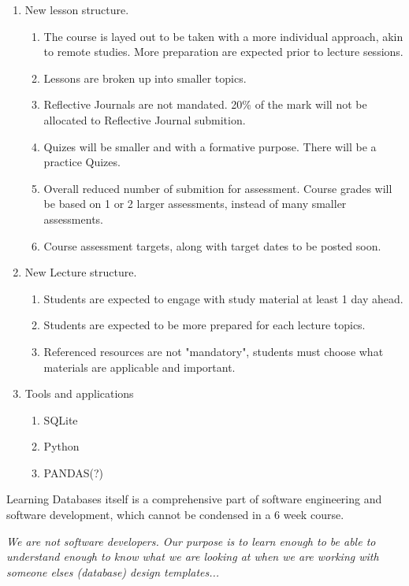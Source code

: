 {\begin{enumerate}
    \item New lesson structure.
        \begin{enumerate}
            \item The course is layed out to be taken with a more individual approach, akin to remote studies. More preparation are expected prior to lecture sessions.
            \item Lessons are broken up into smaller topics.
            \item Reflective Journals are not mandated. 20\% of the mark will not be allocated to Reflective Journal submition.
            \item Quizes will be smaller and with a formative purpose. There will be a practice Quizes.
            \item Overall reduced number of submition for assessment. Course grades will be based on 1 or 2 larger assessments, instead of many smaller assessments.
            \item Course assessment targets, along with target dates to be posted soon.
        \end{enumerate}
    \item New Lecture structure.
        \begin{enumerate}
            \item Students are expected to engage with study material at least 1 day ahead.
            \item Students are expected to be more prepared for each lecture topics.
            \item Referenced resources are not "mandatory", students must choose what materials are applicable and important.
        \end{enumerate}
    \item Tools and applications
        \begin{enumerate}
            \item SQLite
            \item Python
            \item PANDAS(?)
        \end{enumerate}
\end{enumerate}

Learning Databases itself is a comprehensive part of software engineering and software development, which cannot be condensed in a 6 week course.

\begin{displayquote}\label{quote}
    {\emph{We are not software developers. Our purpose is to learn enough to be able to understand enough to know what we are looking at when we are working with someone elses (database) design templates...\\}}
    {}
\end{displayquote}

}
